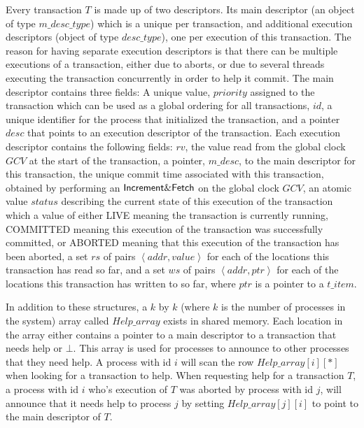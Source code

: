 \documentclass[runningheads,a4paper]{llncs}
\newcommand{\tuple}[1]{\ensuremath{\left \langle #1 \right \rangle }}
\begin{document}
Every transaction $T$ is made up of two descriptors.
Its main descriptor (an object of type $\mathit{m\_desc\_type}$) which is a unique per transaction, and additional
execution descriptors (object of type $\mathit{desc\_type}$), one per execution of this transaction.
The reason for having separate execution descriptors is that there can be multiple executions of a transaction,
either due to aborts, or due to several threads executing the transaction concurrently in order to help it commit.
The main descriptor contains three fields:
A unique value, $\mathit{priority}$ assigned to the transaction which can be used as a global ordering for all transactions,
$\mathit{id}$, a unique identifier for the process that initialized the transaction, and a pointer $\mathit{desc}$ that points
to an execution descriptor of the transaction.
Each execution descriptor contains the following fields:
$\mathit{rv}$, the value read from the global clock $\mathit{GCV}$ at the start of the transaction,
a pointer, $\mathit{m\_desc}$, to the main descriptor for this transaction,
the unique commit time associated with this transaction, obtained by performing an ${\sf Increment\&Fetch}$ on the global
clock $\mathit{GCV}$,
an atomic value $\mathit{status}$ describing the current state of this execution of the transaction which a value of either
LIVE meaning the transaction is currently running, COMMITTED meaning this execution of the transaction was successfully committed,
or ABORTED meaning that this execution of the transaction has been aborted,
a set $\mathit{rs}$ of pairs $\tuple{\mathit{addr,value}}$ for each of the locations this transaction has read so far,
and a set $\mathit{ws}$ of pairs $\tuple{\mathit{addr,ptr}}$ for each of the locations this transaction has written to so far, where $\mathit{ptr}$ is 
a pointer to a $\mathit{t\_item}$.

In addition to these structures, a $\mathit{k}$ by $\mathit{k}$ (where $\mathit{k}$ is the number of processes in the system)
array called $\mathit{Help\_array}$ exists in shared memory.
Each location in the array either contains a pointer to a main descriptor to a transaction that needs help or $\bot$.
This array is used for processes to announce to other processes that they need help.
A process with id $\mathit{i}$ will scan the row $\mathit{Help\_array}[\mathit{i}][\mathit{*}]$ when looking for a transaction to help.
When requesting help for a transaction $T$, a process with id $\mathit{i}$ who's execution of $T$ was aborted by process with id $\mathit{j}$, will
announce that it needs help to process $\mathit{j}$ by setting $\mathit{Help\_array}[\mathit{j}][\mathit{i}]$ to point to the main descriptor of $T$.
\end{document}
